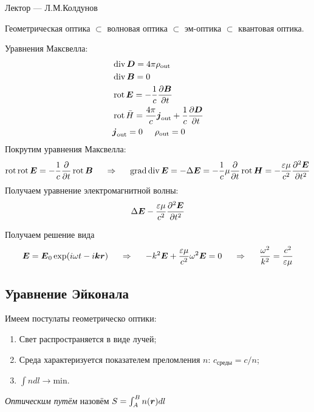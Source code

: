 Лектор --- Л.М.Колдунов

Геометрическая оптика $\subset$  волновая оптика $\subset$ эм-оптика $\subset$ квантовая оптика.

Уравнения Максвелла:
\begin{align*}
	&\mathop{\mathrm{div}}\nolimits \mbox{\boldmath $D$} = 4 \pi \rho_{\text{out}}\\
	&\mathop{\mathrm{div}}\nolimits \mbox{\boldmath $B$} = 0\\
	&\mathop{\mathrm{rot}}\nolimits \mbox{\boldmath $E$} = -\frac{1}{c} \frac{\partial \mbox{\boldmath $B$}}{\partial t}\\
	&\mathop{\mathrm{rot}}\nolimits \bar{H} = \frac{4 \pi}{c}  \mbox{\boldmath $j$}_{\text{out}} + \frac{1}{c} \frac{\partial \mbox{\boldmath $D$}}{\partial t}\\
	&\mbox{\boldmath $j$}_{\text{out}} = 0
	\hspace{0.5 cm}
	\rho_{\text{out}} = 0\\
\end{align*}
Покрутим уравнения Максвелла:
\begin{equation*}
	\mathop{\mathrm{rot}}\nolimits \mathop{\mathrm{rot}}\nolimits \mbox{\boldmath $E$} = - \frac{1}{c} \frac{\partial}{\partial t} \mathop{\mathrm{rot}}\nolimits \mbox{\boldmath $B$}
	\hspace{0.5 cm}
	\Rightarrow
	\hspace{0.5 cm}
	\mathop{\mathrm{grad}}\nolimits \mathop{\mathrm{div}}\nolimits \mbox{\boldmath $E$} = - \Delta \mbox{\boldmath $E$} = -\frac{1}{c}\mu \frac{\partial}{\partial t} \mathop{\mathrm{rot}}\nolimits \mbox{\boldmath $H$} = -\frac{\varepsilon \mu}{c^2} \frac{\partial^2 \mbox{\boldmath $E$}}{\partial t^2}\\
\end{equation*}
Получаем уравнение электромагнитной волны:
\begin{equation}
	\Delta \mbox{\boldmath $E$} - \frac{\varepsilon \mu}{c^2} \frac{\partial^2 \mbox{\boldmath $E$}}{\partial t^2}
	\label{wave_eq}
\end{equation}

Получаем решение вида 
\begin{equation*}
	\mbox{\boldmath $E$} = \mbox{\boldmath $E$}_0 \exp(i \omega t - i \mbox{\boldmath $k$} \mbox{\boldmath $r$}) 
	\hspace{0.5 cm}
	\Rightarrow
	\hspace{0.5 cm}
	- k^2 \mbox{\boldmath $E$} + \frac{\varepsilon \mu}{c^2}\omega^2 \mbox{\boldmath $E$} = 0
	\hspace{0.5 cm}
	\Rightarrow
	\hspace{0.5 cm}
	\frac{\omega^2}{k^2} = \frac{c^2}{\varepsilon \mu}
\end{equation*}


\subsection*{Уравнение Эйконала}
Имеем постулаты геометрическо оптики:
\begin{enumerate}
	\item Свет распространяется в виде лучей; 
	\item Среда характеризуется показателем преломления $n$: $c_{\text{среды}} = c/n$;
	\item $\int n d l \to \text{min}$.
\end{enumerate}
\begin{to_def}
	\textit{Оптическим путём} назовём $S = \int_A^B n(\mbox{\boldmath $r$}) d l$	
\end{to_def}

